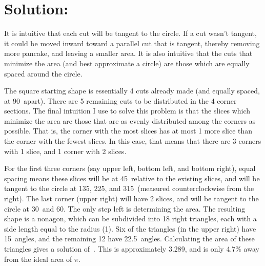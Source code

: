 \documentclass{article}
\begin{document}
\section*{Solution:}

It is intuitive that each cut will be tangent to the circle.
If a cut wasn't tangent, it could be moved inward toward a parallel cut that is tangent, thereby removing more pancake, and leaving a smaller area.
It is also intuitive that the cuts that minimize the area (and best approximate a circle) are those which are equally spaced around the circle.

The square starting shape is essentially 4 cuts already made (and equally spaced, at 90\textdegree\ apart).
There are 5 remaining cuts to be distributed in the 4 corner sections.
The final intuition I use to solve this problem is that the slices which minimize the area are those that are as evenly distributed among the corners as possible.
That is, the corner with the most slices has at most 1 more slice than the corner with the fewest slices.
In this case, that means that there are 3 corners with 1 slice, and 1 corner with 2 slices.

For the first three corners (say upper left, bottom left, and bottom right), equal spacing means these slices will be at 45\textdegree\ relative to the existing slices, and will be tangent to the circle at 135\textdegree, 225\textdegree, and 315\textdegree\ (measured counterclockwise from the right).
The last corner (upper right) will have 2 slices, and will be tangent to the circle at 30\textdegree\ and 60\textdegree.
The only step left is determining the area.
The resulting shape is a nonagon, which can be subdivided into 18 right triangles, each with a side length equal to the radius (1).
Six of the triangles (in the upper right) have 15\textdegree\ angles, and the remaining 12 have 22.5\textdegree\ angles.
Calculating the area of these triangles gives a solution of
\,.
This is approximately 3.289, and is only 4.7\% away from the ideal area of $\pi$.
\end{document}
